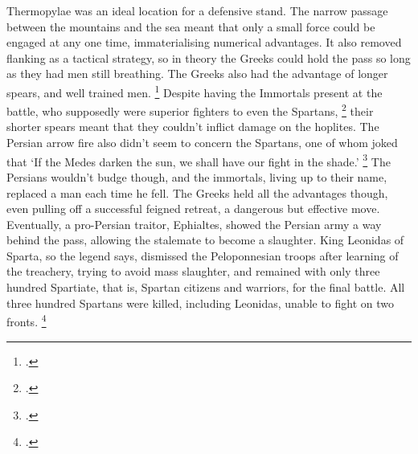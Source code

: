 \documentclass[twoside, a4paper, 12pt]{article}
\begin{document}
\par\vspace{1em}

Thermopylae was an ideal location for a defensive stand. The narrow passage
between the mountains and the sea meant that only a small force could be engaged
at any one time, immaterialising numerical advantages. It also removed flanking
as a tactical strategy, so in theory the Greeks could hold the pass
so long as they had men still breathing. The Greeks also had the advantage
of longer spears, and well trained men. \footcite[135]{green_corner_freedom}
Despite having the Immortals present
at the battle, who supposedly were superior fighters to even the Spartans,
\footcite{kim_grecopersia_2017}
their shorter spears meant that they couldn't inflict damage on the hoplites.
The Persian arrow fire also didn't seem to concern the Spartans, one of
whom joked that `If the Medes darken the sun, we shall have our fight in the shade.'
\footcite[Book 7.226]{herodotus_1920}
The Persians wouldn't budge though, and the immortals, living up to their name,
replaced a man each time he fell. The Greeks held all the advantages though,
even pulling off a successful feigned retreat, a dangerous but effective move.
Eventually, a pro-Persian traitor, Ephialtes, showed the Persian army a way behind the pass,
allowing the stalemate to become a slaughter. King Leonidas of Sparta, so the
legend says, dismissed the Peloponnesian troops after learning of the treachery,
trying to avoid mass slaughter, and remained with only three hundred Spartiate,
that is, Spartan citizens and warriors, for the final battle.
All three hundred Spartans were killed, including Leonidas,
unable to fight on two fronts. \footcite[139-42]{green_corner_freedom}

\par\vspace{1em}
\end{document}
